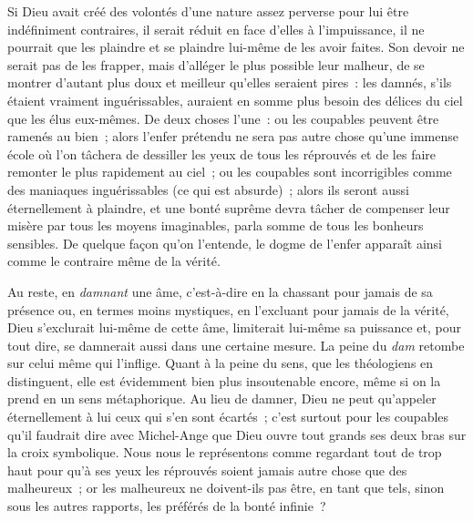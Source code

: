 \documentclass[french,twoside]{book} %
\begin{document}
Si Dieu avait créé des volontés d’une nature assez perverse pour lui être indéfiniment contraires, il serait réduit en face d’elles à l’impuissance, il ne pourrait que les plaindre et se plaindre lui-même de les avoir faites. Son devoir ne serait pas de les frapper, mais d’alléger le plus possible leur malheur, de se montrer d’autant plus doux et meilleur qu’elles seraient pires : les damnés, s’ils étaient vraiment inguérissables, auraient en somme plus besoin des délices du ciel que les élus eux-mêmes. De deux choses l’une : ou les coupables peuvent être ramenés au bien ; alors l’enfer prétendu ne sera pas autre chose qu’une immense école où l’on tâchera de dessiller les yeux de tous les réprouvés et de les faire remonter le plus rapidement au ciel ; ou les coupables sont incorrigibles comme des maniaques inguérissables (ce qui est absurde) ; alors ils seront aussi éternellement à plaindre, et une bonté suprême devra tâcher de compenser leur misère par tous les moyens imaginables, parla somme de tous les bonheurs sensibles. De quelque façon qu’on l’entende, le dogme de l’enfer apparaît ainsi comme le contraire même de la vérité.\par
Au reste, en \emph{damnant} une âme, c’est-à-dire en la chassant pour jamais de sa présence ou, en termes moins mystiques, en l’excluant pour jamais de la vérité, Dieu s’exclurait lui-même de cette âme, limiterait lui-même sa puissance et, pour tout dire, se damnerait aussi dans une certaine mesure. La peine du \emph{dam} retombe sur celui même qui l’inflige. Quant à la peine du sens, que les théologiens en distinguent, elle est évidemment bien plus insoutenable encore, même si on la prend en un sens métaphorique. Au lieu de damner, Dieu ne peut qu’appeler éternellement à lui ceux qui s’en sont écartés ; c’est surtout pour les coupables qu’il faudrait dire avec Michel-Ange que Dieu ouvre tout grands ses deux bras sur la croix symbolique. Nous nous le représentons comme regardant tout de trop haut pour qu’à ses yeux les réprouvés soient jamais autre chose que des malheureux ; or les malheureux ne doivent-ils pas être, en tant que tels, sinon sous les autres rapports, les préférés de la bonté infinie ?
\end{document}
